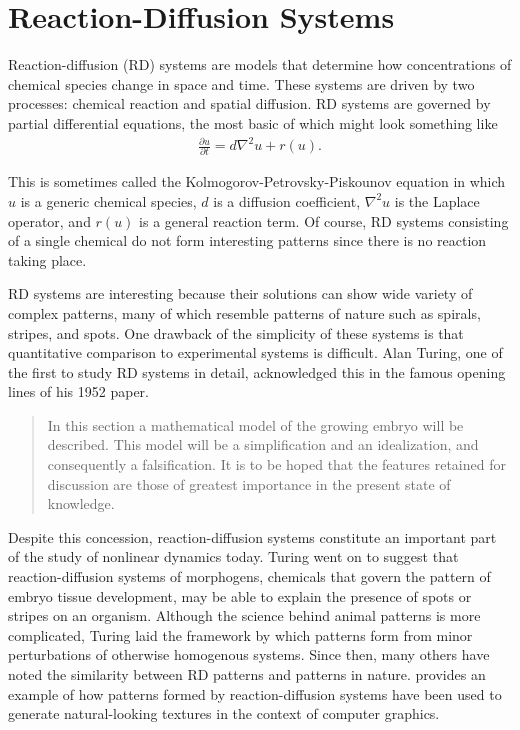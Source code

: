 \chapter{Reaction-Diffusion Systems}

	Reaction-diffusion (RD) systems are models that determine how concentrations of chemical species change in space and time. These systems are driven by two processes: chemical reaction and spatial diffusion. RD systems are governed by partial differential equations, the most basic of which might look something like
	\begin{align}
		\frac{\partial u}{\partial t} = d \nabla^2 u + r(u).
		\label{eq:KPP}
	\end{align}

This is sometimes called the Kolmogorov-Petrovsky-Piskounov equation in which $u$ is a generic chemical species, $d$ is a diffusion coefficient, $\nabla^2 u$ is the Laplace operator, and $r(u)$ is a general reaction term. Of course, RD systems consisting of a single chemical do not form interesting patterns since there is no reaction taking place.

	RD systems are interesting because their solutions can show wide variety of complex patterns, many of which resemble patterns of nature such as spirals, stripes, and spots. One drawback of the simplicity of these systems is that quantitative comparison to experimental systems is difficult. Alan Turing, one of the first to study RD systems in detail, acknowledged this in the famous opening lines of his 1952 paper.
%
\begin{quote}
In this section a mathematical model of the growing embryo will be described. This model will be a simplification and an idealization, and consequently a falsification. It is to be hoped that the features retained for discussion are those of greatest importance in the present state of knowledge.
\end{quote}
%
	Despite this concession, reaction-diffusion systems constitute an important part of the study of nonlinear dynamics today. Turing went on to suggest that reaction-diffusion systems of morphogens, chemicals that govern the pattern of embryo tissue development, may be able to explain the presence of spots or stripes on an organism. Although the science behind animal patterns is more complicated, Turing laid the framework by which patterns form from minor perturbations of otherwise homogenous systems. Since then, many others have noted the similarity between RD patterns and patterns in nature.  provides an example of how patterns formed by reaction-diffusion systems have been used to generate natural-looking textures in the context of computer graphics.

